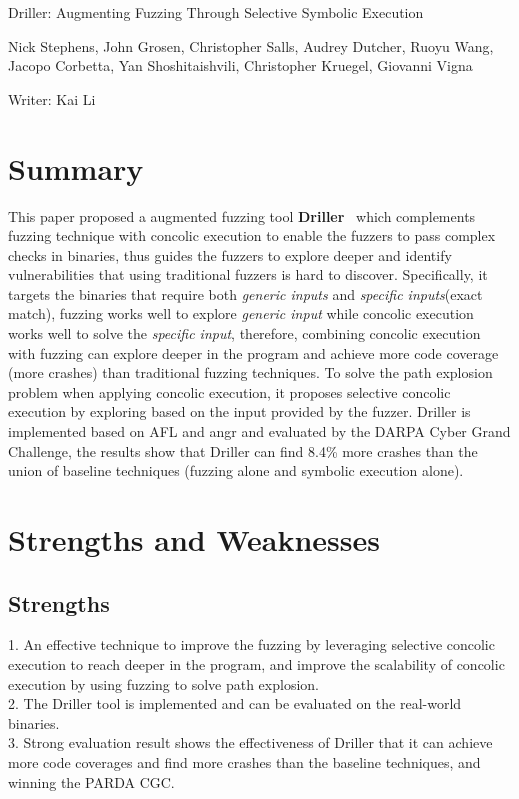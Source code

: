 \documentclass[letterpaper,11pt]{article}
\begin{document}
\begin{center}
{\Large Driller: Augmenting Fuzzing Through Selective Symbolic Execution} 

{Nick Stephens, John Grosen, Christopher Salls, Audrey Dutcher, Ruoyu Wang, Jacopo Corbetta, Yan Shoshitaishvili, Christopher Kruegel, Giovanni Vigna}
\bigskip

{\large Writer: Kai Li}
\date{\today}
\end{center}


\section{Summary}
This paper proposed a augmented fuzzing tool \textbf{Driller}~\cite{Driller} which complements fuzzing technique with concolic execution to enable the fuzzers to pass complex checks in binaries, thus guides the fuzzers to explore deeper and identify vulnerabilities that using traditional fuzzers is hard to discover. Specifically, it targets the binaries that require both \textit{generic inputs} and \textit{specific inputs}(exact match), fuzzing works well to explore \textit{generic input} while concolic execution works well to solve the \textit{specific input}, therefore, combining concolic execution with fuzzing can explore deeper in the program and achieve more code coverage (more crashes) than traditional fuzzing techniques. To solve the path explosion problem when applying concolic execution, it proposes selective concolic execution by exploring based on the input provided by the fuzzer. Driller is implemented based on AFL and angr and evaluated by the DARPA Cyber Grand Challenge, the results show that Driller can find 8.4\% more crashes than the union of baseline techniques (fuzzing alone and symbolic execution alone).  

\section{Strengths and Weaknesses}
\subsection {Strengths}
1. An effective technique to improve the fuzzing by leveraging selective concolic execution to reach deeper in the program, and improve the scalability of concolic execution by using fuzzing to solve path explosion.\\
2. The Driller tool is implemented and can be evaluated on the real-world binaries.\\
3. Strong evaluation result shows the effectiveness of Driller that it can achieve more code coverages and find more crashes than the baseline techniques, and winning the PARDA CGC. 
\end{document}
